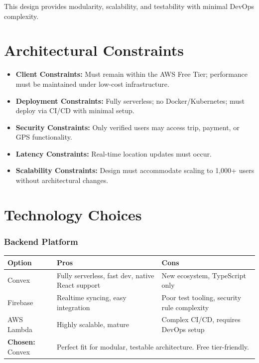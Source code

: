 \documentclass[12pt]{article}
\begin{document}
This design provides modularity, scalability, and testability with minimal DevOps complexity.

\section{Architectural Constraints}
\begin{itemize}
  \item \textbf{Client Constraints:} Must remain within the AWS Free Tier; performance must be maintained under low-cost infrastructure.
  \item \textbf{Deployment Constraints:} Fully serverless; no Docker/Kubernetes; must deploy via CI/CD with minimal setup.
  \item \textbf{Security Constraints:} Only verified users may access trip, payment, or GPS functionality.
  \item \textbf{Latency Constraints:} Real-time location updates must occur.
  \item \textbf{Scalability Constraints:} Design must accommodate scaling to 1,000+ users without architectural changes.
\end{itemize}

\section{Technology Choices}

\subsubsection*{Backend Platform}
\begin{tabular}{|l|p{6cm}|p{6cm}|}
\hline
\textbf{Option} & \textbf{Pros} & \textbf{Cons} \\
\hline
Convex & Fully serverless, fast dev, native React support & New ecosystem, TypeScript only \\
\hline
Firebase & Realtime syncing, easy integration & Poor test tooling, security rule complexity \\
\hline
AWS Lambda & Highly scalable, mature & Complex CI/CD, requires DevOps setup \\
\hline
\textbf{Chosen:} Convex & \multicolumn{2}{l|}{Perfect fit for modular, testable architecture. Free tier-friendly.} \\
\hline
\end{tabular}

\vspace{1em}
\end{document}
